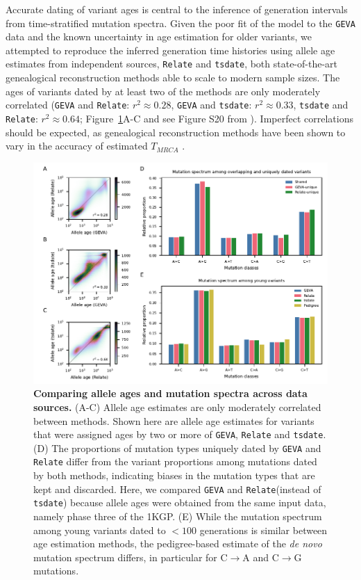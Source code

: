 \documentclass[]{article}
\newcommand{\GEVA}{\texttt{GEVA}\xspace}
\newcommand{\tsdate}{\texttt{tsdate}\xspace}
\newcommand{\relate}{\texttt{Relate}\xspace}
\begin{document}
Accurate dating of variant ages is central to the inference of generation
intervals from time-stratified mutation spectra.  Given the poor fit of the
model to the \GEVA data and the known uncertainty in age estimation for older
variants, we attempted to reproduce the inferred generation time histories
using allele age estimates from independent sources, \relate
\citep{speidel2019method} and \tsdate \citep{wohns2022unified}, both
state-of-the-art genealogical reconstruction methods able to scale to modern
sample sizes.  The ages of variants dated by at least two of the methods are
only moderately correlated (\GEVA and \relate: $r^2 \approx 0.28$, \GEVA and
\tsdate: $r^2 \approx 0.33$, \tsdate and \relate: $r^2 \approx 0.64$;
Figure~\ref{fig:data-comp}A-C and see Figure S20 from
\citet{wohns2022unified}). Imperfect correlations should be expected, as
genealogical reconstruction methods have been shown to vary in the accuracy of
estimated $T_{MRCA}$ \citep{brandt2022evaluation}.

\begin{figure}[t!]
    \centering
    \includegraphics{../plots/fig2.pdf}
    \caption{
        \textbf{Comparing allele ages and mutation spectra across data
        sources.} (A-C) Allele age estimates are only moderately correlated
        between methods. Shown here are allele age estimates for variants that
        were assigned ages by two or more of \GEVA, \relate and \tsdate. (D)
        The proportions of mutation types uniquely dated by \GEVA and \relate
        differ from the variant proportions among mutations dated by both
        methods, indicating biases in the mutation types that are kept and
        discarded. Here, we compared \GEVA and \relate (instead of \tsdate)
        because allele ages were obtained from the same input data, namely
        phase three of the 1KGP.
        (E) While the mutation spectrum among young variants dated
        to $<100$ generations is similar between age estimation methods,
        the pedigree-based estimate of the \emph{de novo} mutation spectrum
        \citep{jonsson2017parental} differs, in particular for C$\rightarrow$A
        and C$\rightarrow$G mutations.
    }
    \label{fig:data-comp}
\end{figure}
\end{document}
